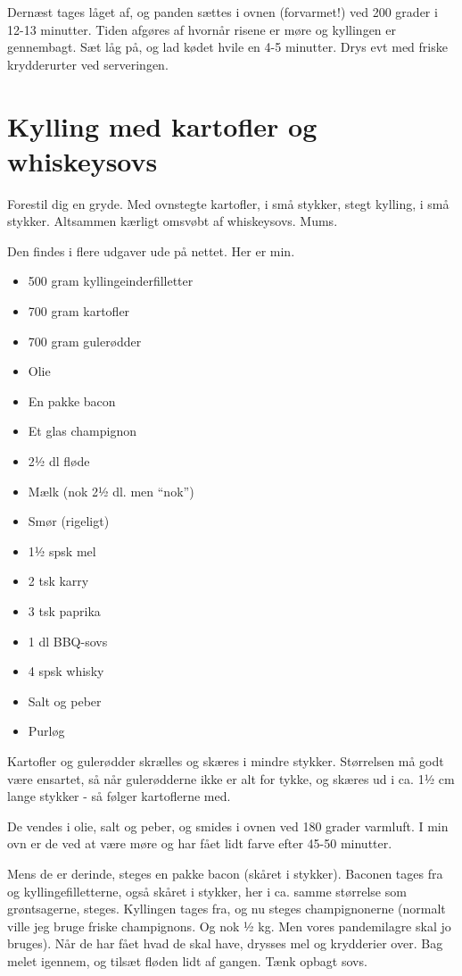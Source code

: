 \documentclass[
]{book}
\providecommand{\tightlist}{%
  \setlength{\itemsep}{0pt}\setlength{\parskip}{0pt}}
\begin{document}
Dernæst tages låget af, og panden sættes i ovnen (forvarmet!) ved 200 grader i 12-13 minutter. Tiden afgøres af hvornår risene er møre og kyllingen er gennembagt. Sæt låg på, og lad kødet hvile en 4-5 minutter. Drys evt med friske krydderurter ved serveringen.

\hypertarget{kylling-med-kartofler-og-whiskeysovs}{%
\section{Kylling med kartofler og whiskeysovs}\label{kylling-med-kartofler-og-whiskeysovs}}

Forestil dig en gryde. Med ovnstegte kartofler, i små stykker, stegt kylling, i små stykker. Altsammen kærligt omsvøbt af whiskeysovs. Mums.

Den findes i flere udgaver ude på nettet. Her er min.

\begin{itemize}
\tightlist
\item
  500 gram kyllingeinderfilletter
\item
  700 gram kartofler
\item
  700 gram gulerødder
\item
  Olie
\item
  En pakke bacon
\item
  Et glas champignon
\item
  2½ dl fløde
\item
  Mælk (nok 2½ dl. men ``nok'')
\item
  Smør (rigeligt)
\item
  1½ spsk mel
\item
  2 tsk karry
\item
  3 tsk paprika
\item
  1 dl BBQ-sovs
\item
  4 spsk whisky
\item
  Salt og peber
\item
  Purløg
\end{itemize}

Kartofler og gulerødder skrælles og skæres i mindre stykker. Størrelsen må godt være ensartet, så når gulerødderne ikke er alt for tykke, og skæres ud i ca. 1½ cm lange stykker - så følger kartoflerne med.

De vendes i olie, salt og peber, og smides i ovnen ved 180 grader varmluft. I min ovn er de ved at være møre og har fået lidt farve efter 45-50 minutter.

Mens de er derinde, steges en pakke bacon (skåret i stykker). Baconen tages fra og kyllingefilletterne, også skåret i stykker, her i ca. samme størrelse som grøntsagerne, steges. Kyllingen tages fra, og nu steges champignonerne (normalt ville jeg bruge friske champignons. Og nok ½ kg. Men vores pandemilagre skal jo bruges). Når de har fået hvad de skal have, drysses mel og krydderier over. Bag melet igennem, og tilsæt fløden lidt af gangen. Tænk opbagt sovs.
\end{document}
